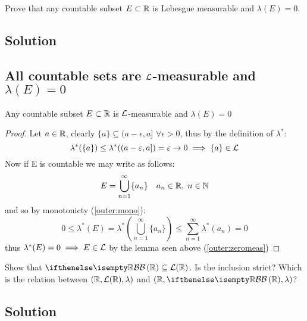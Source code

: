 
\question
Prove that any countable subset $E\subset\mathbb{R}$ is Lebesgue measurable and $\lambda(E) = 0$.

\subsection*{Solution}

\subsection{All countable sets are \texorpdfstring{$\mathcal{L}$}{L}-measurable and \texorpdfstring{$\lambda(E)=0$}{l(E)=0}}
Any countable subset $E\subset\mathbb{R}$ is $\mathcal{L}$-measurable and $\lambda(E)=0$
\begin{proof}
    Let $a\in\mathbb{R}$, clearly $\{ a \} \subseteq (a-\epsilon, a]$ $\forall \epsilon >0$, thus by the definition of $\lambda^*$:
    \[
        \lambda^*(\{ a \}) \leq \lambda^*( (a-\varepsilon, a] )  = \varepsilon \to 0  \implies \{ a \}\in\mathcal{L}
    \]
    Now if E is countable we may write as follows:
    \[
        E = \bigcup_{n=1}^{\infty} \{ a_n \} \quad a_n\in\mathbb{R}, \; n\in\mathbb{N}
    \]
    and so by monotonicty (\ref{outer:mono}):
    \[
        0 \leq \lambda^*(E) = \lambda^*\left( \bigcup_{n=1}^{\infty} \{ a_n \} \right) \leq \sum_{n=1}^{\infty} \lambda^*(a_n) = 0
    \]
    thus $\lambda^*(E)=0 \implies E\in \mathcal{L}$ by the lemma seen above (\ref{outer:zeromeas})
\end{proof}


\question
Show that $\B[\R] \subseteq \Leb(\R)$. Is the inclusion strict? Which is the relation between $(\mathbb{R},\mathcal{L}(\mathbb{R}), \lambda)$ and
$(\R, \B[\R], \lambda)$?

\subsection*{Solution}


